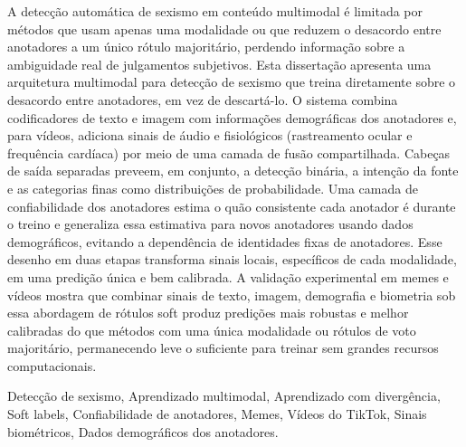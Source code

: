 A detecção automática de sexismo em conteúdo multimodal é limitada por métodos que usam apenas uma modalidade ou que reduzem o desacordo entre anotadores a um único rótulo majoritário, perdendo informação sobre a ambiguidade real de julgamentos subjetivos. Esta dissertação apresenta uma arquitetura multimodal para detecção de sexismo que treina diretamente sobre o desacordo entre anotadores, em vez de descartá-lo. O sistema combina codificadores de texto e imagem com informações demográficas dos anotadores e, para vídeos, adiciona sinais de áudio e fisiológicos (rastreamento ocular e frequência cardíaca) por meio de uma camada de fusão compartilhada. Cabeças de saída separadas preveem, em conjunto, a detecção binária, a intenção da fonte e as categorias finas como distribuições de probabilidade. Uma camada de confiabilidade dos anotadores estima o quão consistente cada anotador é durante o treino e generaliza essa estimativa para novos anotadores usando dados demográficos, evitando a dependência de identidades fixas de anotadores. Esse desenho em duas etapas transforma sinais locais, específicos de cada modalidade, em uma predição única e bem calibrada. A validação experimental em memes e vídeos mostra que combinar sinais de texto, imagem, demografia e biometria sob essa abordagem de rótulos soft produz predições mais robustas e melhor calibradas do que métodos com uma única modalidade ou rótulos de voto majoritário, permanecendo leve o suficiente para treinar sem grandes recursos computacionais.

\mbox{}\linebreak
{} Detecção de sexismo, Aprendizado multimodal, Aprendizado com divergência, Soft labels, Confiabilidade de anotadores, Memes, Vídeos do TikTok, Sinais biométricos, Dados demográficos dos anotadores.


